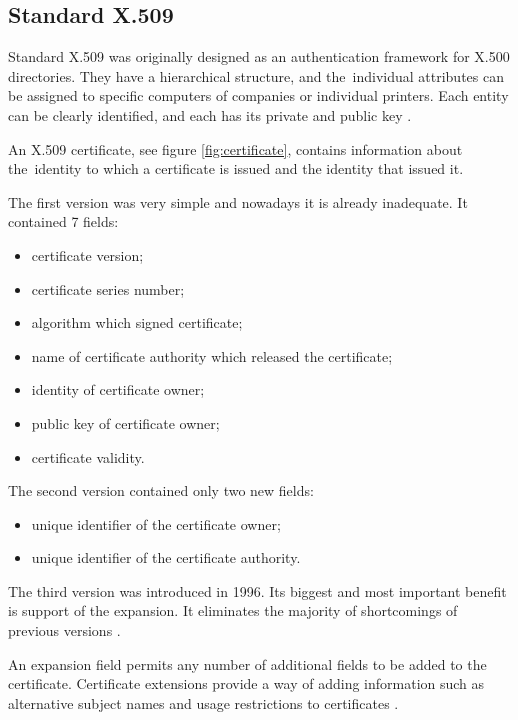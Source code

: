 \documentclass[
  oneside, 12pt, 
  printed, %
  notable,   %
  nolof,     %
  nolot,     %
]{fithesis3}
\begin{document}
\subsection{Standard X.509}\label{x509}
Standard X.509 was originally designed as an authentication framework for X.500 directories. They 
have a hierarchical structure, and the~individual attributes can be assigned to specific computers 
of companies or individual printers. Each entity can be clearly identified, and each has its 
private and public key \cite{schmeh2006cryptography}. 

An X.509 certificate, see figure \ref{fig:certificate}, contains information about the~identity to 
which a certificate is issued and the identity that issued it. 

The first version was very simple and nowadays it is already inadequate. It contained 7 fields:
\begin{itemize}[leftmargin=2em,rightmargin=1em,itemsep=0.75\parskip,parsep=0em,topsep=0em,partopsep=0em]
\item certificate version;
\item certificate series number;
\item algorithm which signed certificate;
\item name of certificate authority which released the certificate;
\item identity of certificate owner;
\item public key of certificate owner;
\item certificate validity.
\end{itemize}
\vskip 0.1in

The second version contained only two new fields:
\begin{itemize}[leftmargin=2em,rightmargin=1em,itemsep=0.75\parskip,parsep=0em,topsep=0em,partopsep=0em]
\item unique identifier of the certificate owner;
\item unique identifier of the certificate authority.
\end{itemize}
\vskip 0.1in

The third version was introduced in 1996. Its biggest and most important benefit is support of
the expansion. It eliminates the majority of shortcomings of previous versions 
\cite{housley2002internet}. 

An expansion field permits any number of additional fields to be added to the certificate. 
Certificate extensions provide a way of adding information such as alternative subject names and 
usage restrictions to certificates \cite{b.3}.
\end{document}
